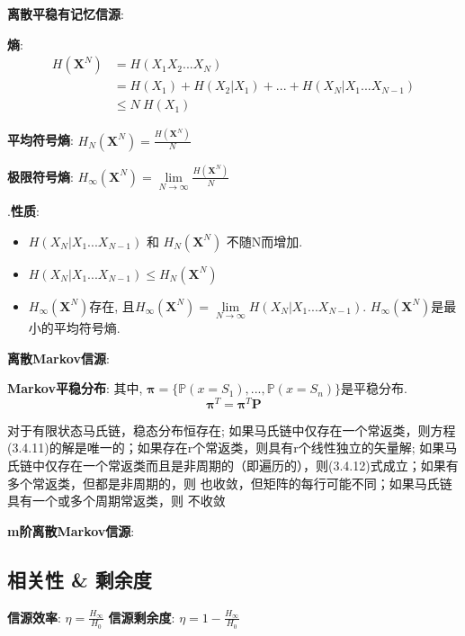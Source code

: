 \documentclass{article}
\begin{document}
            \textbf{离散平稳有记忆信源}:
                
                \qquad \textbf{熵}:
                    \begin{align*}
                        H(\boldsymbol X^N) 
                        &= H(X_1 X_2 ... X_N) \tag{定义}\\
                        &= H(X_1) + H(X_2|X_1) + ... + H(X_N | X_1 ... X_{N-1}) \tag{条件熵展开}\\
                        &\le N\ H(X_1) \tag{熵的不增原理}
                    \end{align*}
                    
                \qquad \textbf{平均符号熵}: $H_N(\boldsymbol X^N) = \frac{H(\boldsymbol X^N)}{N}$
                
                \qquad \textbf{极限符号熵}: $H_\infty(\boldsymbol X^N) = \lim\limits_{N \to \infty} \frac{H(\boldsymbol X^N)}{N}$
                
                    \qquad.\qquad \textbf{性质}: 
                        \begin{itemize}
                        \item $H(X_N | X_1 ... X_{N-1})$ 和 $H_N(\boldsymbol X^N)$ 不随N而增加.
                        \item $H(X_N | X_1 ... X_{N-1}) \le H_N(\boldsymbol X^N)$
                        \item $H_\infty(\boldsymbol X^N)$存在, 且$H_\infty(\boldsymbol X^N) = \lim\limits_{N \to \infty} H(X_N | X_1 ... X_{N-1})$. $H_\infty(\boldsymbol X^N)$是最小的平均符号熵.
                        \end{itemize}
                

        \textbf{离散Markov信源}:
        
            \textbf{Markov平稳分布}: 其中, $\boldsymbol \pi = \{\mathbb P(x = S_1), ..., \mathbb P(x = S_n)\}$是平稳分布.
                $$\boldsymbol \pi^T = \boldsymbol \pi^T \boldsymbol P$$
                
                对于有限状态马氏链，稳态分布恒存在; 如果马氏链中仅存在一个常返类，则方程(3.4.11)的解是唯一的；如果存在r个常返类，则具有r个线性独立的矢量解; 如果马氏链中仅存在一个常返类而且是非周期的（即遍历的），则(3.4.12)式成立；如果有多个常返类，但都是非周期的，则       也收敛，但矩阵的每行可能不同；如果马氏链具有一个或多个周期常返类，则      不收敛

        \textbf{m阶离散Markov信源}:

    \subsection{相关性 \& 剩余度}
        \textbf{信源效率}: $\eta = \frac{H_\infty}{H_0}$
        \textbf{信源剩余度}: $\eta = 1 - \frac{H_\infty}{H_0}$
            
\end{document}
